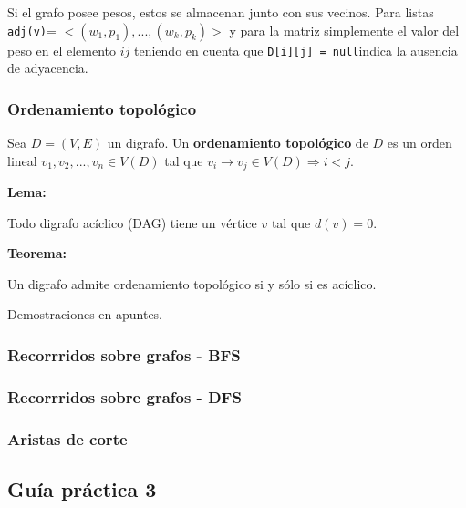 \documentclass[12pt]{article}
\theoremstyle{definition}
\begin{document}
Si el grafo posee pesos, estos se almacenan junto con sus vecinos. Para listas \lstinline|adj(v)|=
$<(w_1, p_1), ... , (w_k, p_k)>$ y para la matriz simplemente el valor del peso en el elemento $ij$ teniendo
en cuenta que \lstinline|D[i][j] = null|indica la ausencia de adyacencia.

\subsubsection{Ordenamiento topológico}
Sea $D=(V,E)$ un digrafo. Un \textbf{ordenamiento topológico} de $D$ es un orden lineal $v_1, v_2, ..., v_n \in V(D)$
tal que $v_i \rightarrow v_j \in V(D) \Rightarrow i<j$.

\textbf{Lema:}
\begin{center}
    Todo digrafo acíclico (DAG) tiene un vértice $v$ tal que $d(v)=0$.
\end{center}

\textbf{Teorema:}
\begin{center}
    Un digrafo admite ordenamiento topológico si y sólo si es acíclico.
\end{center}

Demostraciones en apuntes.

\subsubsection{Recorrridos sobre grafos - BFS}
\subsubsection{Recorrridos sobre grafos - DFS}
\subsubsection{Aristas de corte}
\subsection{Guía práctica 3}
\end{document}
